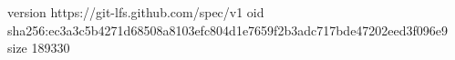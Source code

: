 version https://git-lfs.github.com/spec/v1
oid sha256:ec3a3c5b4271d68508a8103efc804d1e7659f2b3adc717bde47202eed3f096e9
size 189330
